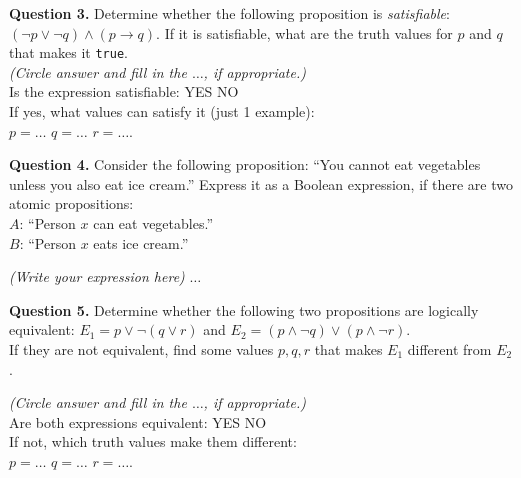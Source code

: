 \documentclass[jou]{apa6}
\begin{document}
\vspace{10pt}
{\bf Question 3.} Determine whether the following proposition is {\em satisfiable}:
$(\neg p \vee \neg q) \wedge (p \rightarrow q)$. If it is satisfiable, what are the 
truth values for $p$ and $q$ that makes it {\tt true}.\\


\vspace{3pt}
\noindent
{\em (Circle answer and fill in the $\ldots$, if appropriate.)}\\
Is the expression satisfiable: \hspace{5ex} YES \hspace{5ex} NO\\
If yes, what values can satisfy it (just 1 example):\\ 
$p = \ldots$ \hspace{5ex} $q = \ldots$ \hspace{5ex} $r = \ldots$. 



\vspace{10pt}
{\bf Question 4.}
Consider the following proposition: ``You cannot eat vegetables unless you also eat ice cream.''
Express it as a Boolean expression, if there are two atomic propositions:\\
$A$: ``Person $x$ can eat vegetables.''\\
$B$: ``Person $x$ eats ice cream.''

\vspace{3pt}
\noindent
{\em (Write your expression here)} $\ldots$


\vspace{10pt}
{\bf Question 5.} 
Determine whether the following two propositions are logically equivalent:
$E_1 =  p \vee \neg (q \vee r)$ and $E_2 = (p \wedge \neg q) \vee (p \wedge \neg r)$.\\
If they are not equivalent, find some values $p,q,r$ that makes $E_1$ different 
from $E_2$.



\vspace{3pt}
\noindent
{\em (Circle answer and fill in the $\ldots$, if appropriate.)}\\
Are both expressions equivalent: \hspace{5ex} YES \hspace{5ex} NO\\
If not, which truth values make them different:\\ 
$p = \ldots$ \hspace{5ex} $q = \ldots$ \hspace{5ex} $r = \ldots$. 
\end{document}
